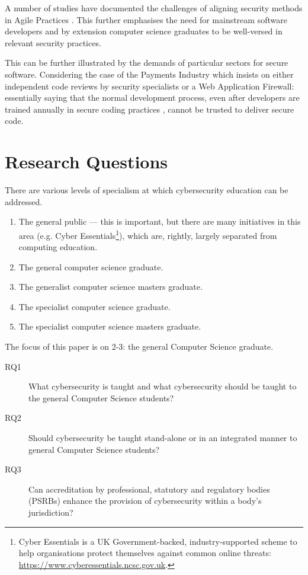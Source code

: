 \documentclass[conference]{IEEEtran}
\begin{document}
A number of studies have documented the challenges of aligning security methods in Agile Practices \cite{vanderHeijden:2018:EPS:3239235.3267426,Bartsch2011a}. This further emphasises the need for mainstream software developers and by extension computer science graduates to be well-versed in relevant security practices.

This can be further illustrated by the demands of particular sectors for secure software. Considering the case of the Payments Industry \cite[6.6]{PCI2018b} which insists on either independent code reviews by security specialists or a Web Application Firewall: essentially saying that the normal development process, even after developers are trained annually in secure coding practices \cite[6.5]{PCI2018b}, cannot be trusted to deliver secure code. 

\section{Research Questions}
There are various levels of specialism at which cybersecurity education can be addressed.
\begin{enumerate}
\item The general public --- this is important, but there are many initiatives in this area (e.g. Cyber Essentials\footnote{Cyber Essentials is a UK Government-backed, industry-supported scheme to help organisations protect themselves against common online threats: \url{https://www.cyberessentials.ncsc.gov.uk}.}), which are, rightly, largely separated from computing education.
\item The general computer science graduate.
\item The generalist computer science masters graduate.
\item The specialist computer science graduate.
\item The specialist computer science masters graduate.
\end{enumerate}
The focus of this paper is on 2-3: the general Computer Science graduate.
\begin{description}
\item[RQ1]What cybersecurity is taught and what cybersecurity should be taught to the general Computer Science  students?
\item[RQ2]Should cybersecurity be taught stand-alone or in an integrated manner to general Computer Science students?
\item[RQ3]Can accreditation by professional, statutory and regulatory bodies (PSRBs) enhance the provision of cybersecurity within a body's jurisdiction?
\end{description}
\end{document}

